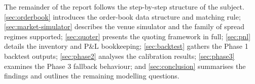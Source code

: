 The remainder of the report follows the step-by-step structure of the
subject. \autoref{sec:orderbook} introduces the order-book data structure
and matching rule; \autoref{sec:market-simulator} describes the venue
simulator and the family of spread regimes supported;
\autoref{sec:quoter} presents the quoting framework in full;
\autoref{sec:pnl} details the inventory and P\&L bookkeeping; \autoref{sec:backtest} gathers the Phase 1 backtest outputs;
\autoref{sec:phase2} analyses the calibration results;
\autoref{sec:phase3} examines the Phase 3 fallback behaviour; and
\autoref{sec:conclusion} summarises the findings and outlines the
remaining modelling questions.
